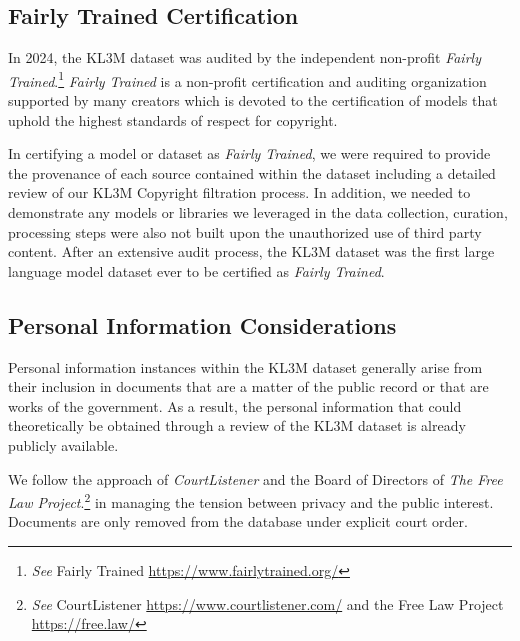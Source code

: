 
\subsection{Fairly Trained Certification}
In 2024, the KL3M dataset was audited by the independent non-profit \textit{Fairly Trained}.\footnote{\textit{See} Fairly Trained \url{https://www.fairlytrained.org/} }  \textit{Fairly Trained} is a non-profit certification and auditing organization supported by many creators which is devoted to the certification of models that uphold the highest standards of respect for copyright.  

In certifying a model or dataset as \textit{Fairly Trained}, we were required to provide the provenance of each source contained within the dataset including a detailed review of our KL3M Copyright filtration process.  In addition, we needed to demonstrate any models or libraries we leveraged in the data collection, curation, processing steps were also not built upon the unauthorized use of third party content. After an extensive audit process, the KL3M dataset was the first large language model dataset ever to be certified as \textit{Fairly Trained}.   





\subsection{Personal Information Considerations}
Personal information instances within the KL3M dataset generally arise from their inclusion in documents that are a matter of the public record or that are works of the government. As a result, the personal information that could theoretically be obtained through a review of the KL3M dataset is already publicly available.

We follow the approach of \textit{CourtListener} and the Board of Directors of \textit{The Free Law Project}.\footnote{\textit{See} CourtListener \url{https://www.courtlistener.com/} and the Free Law Project \url{https://free.law/}} in managing the tension between privacy and the public interest. Documents are only removed from the database under explicit court order.

